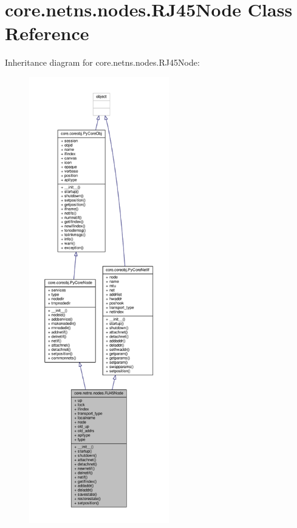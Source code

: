 \hypertarget{classcore_1_1netns_1_1nodes_1_1_r_j45_node}{\section{core.\+netns.\+nodes.\+R\+J45\+Node Class Reference}
\label{classcore_1_1netns_1_1nodes_1_1_r_j45_node}
}


Inheritance diagram for core.\+netns.\+nodes.\+R\+J45\+Node\+:
\nopagebreak
\begin{figure}[H]
\begin{center}
\leavevmode
\includegraphics[height=550pt]{classcore_1_1netns_1_1nodes_1_1_r_j45_node__inherit__graph}
\end{center}
\end{figure}


